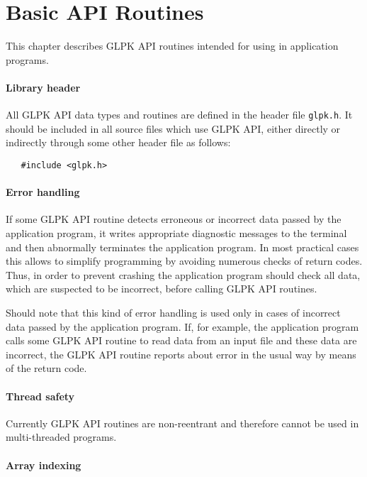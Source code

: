 
\chapter{Basic API Routines}

This chapter describes GLPK API routines intended for using in
application programs.

\subsubsection*{Library header}

All GLPK API data types and routines are defined in the header file
\verb|glpk.h|. It should be included in all source files which use
GLPK API, either directly or indirectly through some other header file
as follows:

\begin{verbatim}
   #include <glpk.h>
\end{verbatim}

\subsubsection*{Error handling}

If some GLPK API routine detects erroneous or incorrect data passed by
the application program, it writes appropriate diagnostic messages to
the terminal and then abnormally terminates the application program.
In most practical cases this allows to simplify programming by avoiding
numerous checks of return codes. Thus, in order to prevent crashing the
application program should check all data, which are suspected to be
incorrect, before calling GLPK API routines.

Should note that this kind of error handling is used only in cases of
incorrect data passed by the application program. If, for example, the
application program calls some GLPK API routine to read data from an
input file and these data are incorrect, the GLPK API routine reports
about error in the usual way by means of the return code.

\subsubsection*{Thread safety}

Currently GLPK API routines are non-reentrant and therefore cannot be
used in multi-threaded programs.

\subsubsection*{Array indexing}

